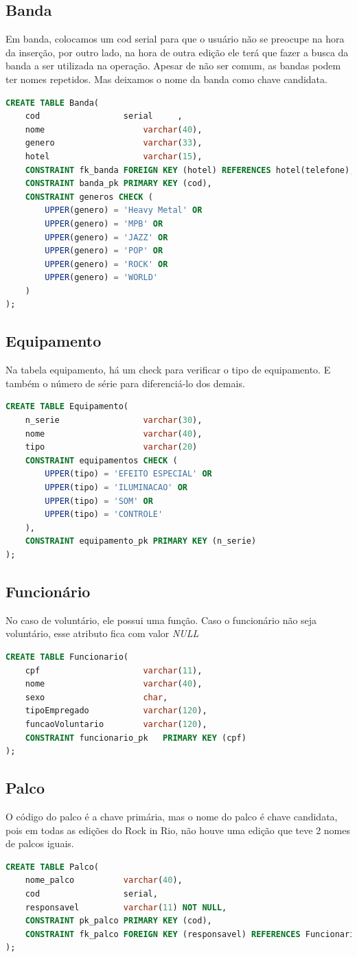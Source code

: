 \documentclass[12pt]{article}
\begin{document}
\subsection{Banda}
Em banda, colocamos um cod serial para que o usuário não se preocupe na hora da inserção, por outro lado, na hora de outra edição ele terá que fazer a busca da banda a ser utilizada na operação. Apesar de não ser comum, as bandas podem ter nomes repetidos. Mas deixamos o nome da banda como chave candidata.
\begin{lstlisting}[language=sql]
CREATE TABLE Banda(
	cod					serial	   ,
	nome					varchar(40),
	genero					varchar(33),
	hotel					varchar(15),
	CONSTRAINT fk_banda FOREIGN KEY (hotel) REFERENCES hotel(telefone),
	CONSTRAINT banda_pk PRIMARY KEY (cod),
	CONSTRAINT generos CHECK (
		UPPER(genero) = 'Heavy Metal' OR 
		UPPER(genero) = 'MPB' OR 
		UPPER(genero) = 'JAZZ' OR 
		UPPER(genero) = 'POP' OR 
		UPPER(genero) = 'ROCK' OR
		UPPER(genero) = 'WORLD'
	)
);
\end{lstlisting}

\subsection{Equipamento}
Na tabela equipamento, há um check para verificar o tipo de equipamento. E também o número de série para diferenciá-lo dos demais.
\begin{lstlisting}[language=sql]
CREATE TABLE Equipamento(
	n_serie					varchar(30),
	nome					varchar(40),
	tipo					varchar(20) 
	CONSTRAINT equipamentos CHECK (
		UPPER(tipo) = 'EFEITO ESPECIAL' OR
		UPPER(tipo) = 'ILUMINACAO' OR
		UPPER(tipo) = 'SOM' OR
		UPPER(tipo) = 'CONTROLE'
	),
	CONSTRAINT equipamento_pk PRIMARY KEY (n_serie)
);
\end{lstlisting}

\subsection{Funcionário}
No caso de voluntário, ele possui uma função. Caso o funcionário não seja voluntário, esse atributo fica com valor \textit{NULL}
\begin{lstlisting}[language=sql]
CREATE TABLE Funcionario(
	cpf						varchar(11),
	nome					varchar(40),
	sexo					char,
	tipoEmpregado			varchar(120),
	funcaoVoluntario		varchar(120),
	CONSTRAINT funcionario_pk	PRIMARY KEY (cpf)
);
\end{lstlisting}

\subsection{Palco}
O código do palco é a chave primária, mas o nome do palco é chave candidata, pois em todas as edições do Rock in Rio, não houve uma edição que teve 2 nomes de palcos iguais.
\begin{lstlisting}[language=sql]
CREATE TABLE Palco(
	nome_palco			varchar(40),
	cod					serial,
	responsavel			varchar(11) NOT NULL,
	CONSTRAINT pk_palco PRIMARY KEY (cod),
	CONSTRAINT fk_palco FOREIGN KEY (responsavel) REFERENCES Funcionario(cpf)
);
\end{lstlisting}
\end{document}
